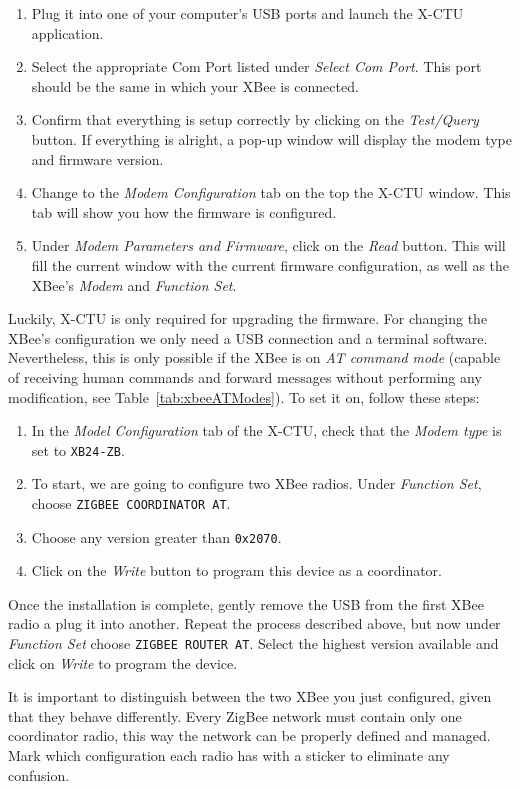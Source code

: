 \begin{enumerate}
	\item Plug it into one of your computer's USB ports and launch the X-CTU application.
	\item Select the appropriate Com Port listed under \emph{Select Com Port}. This port should be the same in which your XBee is connected.
	\item Confirm that everything is setup correctly by clicking on the \emph{Test/Query} button. If everything is alright, a pop-up window will display the modem type and firmware version.
	\item Change to the \emph{Modem Configuration} tab on the top the X-CTU window. This tab will show you how the firmware is configured.
	\item Under \emph{Modem Parameters and Firmware}, click on the \emph{Read} button. This will fill the current window with the current firmware configuration, as well as the XBee's \emph{Modem} and \emph{Function Set}.
\end{enumerate}

Luckily, X-CTU is only required for upgrading the firmware. For changing the XBee's configuration we only need a USB connection and a terminal software. Nevertheless, this is only possible if the XBee is on \emph{AT command mode} (capable of receiving human commands and forward messages without performing any modification, see Table~\ref{tab:xbeeATModes}). To set it on, follow these steps:

\begin{enumerate}
	\item In the \emph{Model Configuration} tab of the X-CTU, check that the \emph{Modem type} is set to \texttt{XB24-ZB}.
	\item To start, we are going to configure two XBee radios. Under \emph{Function Set}, choose \texttt{ZIGBEE COORDINATOR AT}.
	\item Choose any version greater than \texttt{0x2070}.
	\item Click on the \emph{Write} button to program this device as a coordinator.
\end{enumerate}

Once the installation is complete, gently remove the USB from the first XBee radio a plug it into another. Repeat the process described above, but now under \emph{Function Set} choose \texttt{ZIGBEE ROUTER AT}. Select the highest version available and click on \emph{Write} to program the device.

It is important to distinguish between the two XBee you just configured, given that they behave differently. Every ZigBee network must contain only one coordinator radio, this way the network can be properly defined and managed. Mark which configuration each radio has with a sticker to eliminate any confusion.


